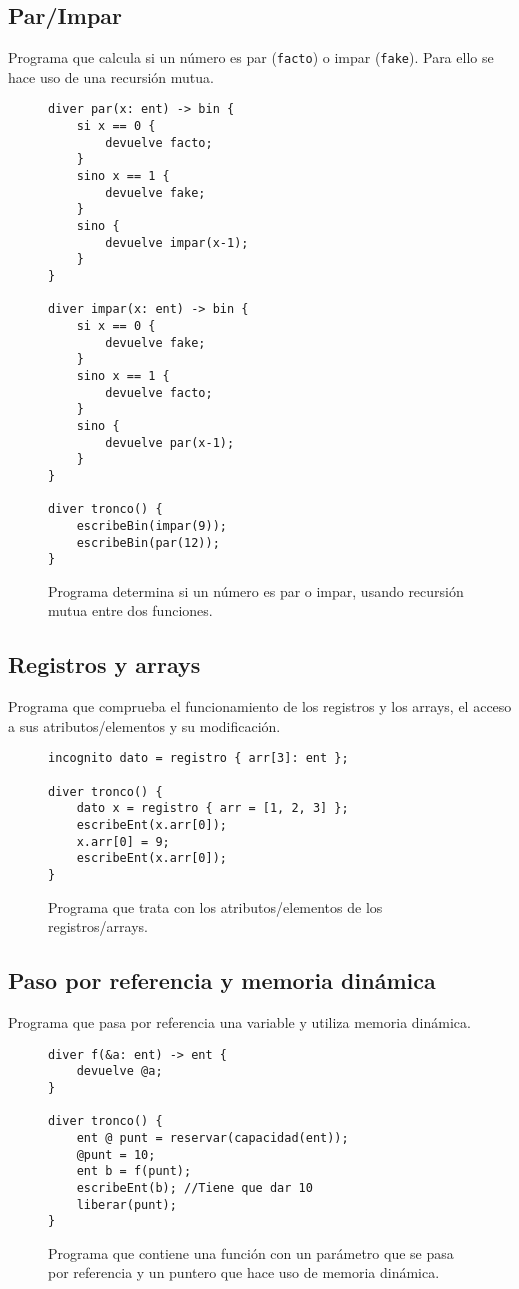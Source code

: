 \subsection{Par/Impar}
Programa que calcula si un número es par (\lstinline{facto}) o impar
(\lstinline{fake}). Para ello se hace uso de una recursión mutua.
\begin{figure}[htbp]
    \centering
    \begin{lstlisting}
diver par(x: ent) -> bin {
    si x == 0 {
        devuelve facto;
    }
    sino x == 1 {
        devuelve fake;
    }
    sino {
        devuelve impar(x-1);
    }
}

diver impar(x: ent) -> bin {
    si x == 0 {
        devuelve fake;
    }
    sino x == 1 {
        devuelve facto;
    }
    sino {
        devuelve par(x-1);
    }
}

diver tronco() {
    escribeBin(impar(9));
    escribeBin(par(12));
}
    \end{lstlisting}
    \caption{Programa determina si un número es par o impar, usando recursión
    mutua entre dos funciones.}
\end{figure}

\subsection{Registros y arrays}
Programa que comprueba el funcionamiento de los registros y los arrays, el
acceso a sus atributos/elementos y su modificación.
\begin{figure}[htbp]
    \centering
    \begin{lstlisting}
incognito dato = registro { arr[3]: ent };

diver tronco() {
    dato x = registro { arr = [1, 2, 3] };
    escribeEnt(x.arr[0]);
    x.arr[0] = 9;
    escribeEnt(x.arr[0]);
}
    \end{lstlisting}
    \caption{Programa que trata con los atributos/elementos de los
    registros/arrays.}
\end{figure}

\subsection{Paso por referencia y memoria dinámica}
Programa que pasa por referencia una variable y utiliza memoria dinámica.
\begin{figure}[htbp]
    \centering
    \begin{lstlisting}
diver f(&a: ent) -> ent {
    devuelve @a;
}

diver tronco() {
    ent @ punt = reservar(capacidad(ent));
    @punt = 10;
    ent b = f(punt);
    escribeEnt(b); //Tiene que dar 10
    liberar(punt);
}
    \end{lstlisting}
    \caption{Programa que contiene una función con un parámetro que se pasa por
    referencia y un puntero que hace uso de memoria dinámica.}
\end{figure}
